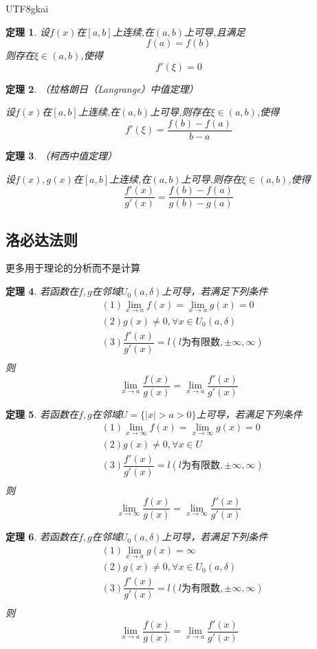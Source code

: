 \documentclass{article}
\newtheorem{theorem}{定理}[subsection]
\begin{document}
\begin{CJK}{UTF8}{gkai}
\begin{theorem}
  设$f(x)$在$[a,b]$上连续,在$(a,b)$上可导,且满足
  \[f(a) = f(b)\]
  则存在$\xi\in(a,b)$,使得
  \[f'(\xi) = 0\]
\end{theorem}

\begin{theorem}（拉格朗日（Langrange）中值定理）
    
  设$f(x)$在$[a,b]$上连续,在$(a,b)$上可导,则存在$\xi\in(a,b)$,使得
  \[f'(\xi) = \dfrac{f(b)-f(a)}{b-a}\]

\end{theorem}

\begin{theorem}（柯西中值定理）
        
  设$f(x),g(x)$在$[a,b]$上连续,在$(a,b)$上可导,则存在$\xi\in(a,b)$,使得
  \[\dfrac{f'(x)}{g'(x)} = \dfrac{f(b)-f(a)}{g(b)-g(a)}\]

\end{theorem}

\subsection{洛必达法则}
更多用于理论的分析而不是计算\\
\begin{theorem}
若函数在$f,g$在邻域$U_0(a,\delta)$上可导，若满足下列条件
\[
\begin{aligned}
&(1)\lim_{x\to a}f(x) =\lim_{x\to a } g(x) = 0\\
&(2)g(x) \neq 0 ,\forall x\in U_0(a,\delta)\\
&(3)\dfrac{f'(x)}{g'(x)} = l(l\text{为有限数},\pm\infty,\infty)\\
\end{aligned}
\]
则
\[\lim_{x\to a}\dfrac{f(x)}{g(x)}=\lim_{x\to a}\dfrac{f'(x)}{g'(x)}\]
\end{theorem}

\begin{theorem}
若函数在$f,g$在邻域$U = \{|x| > a > 0\}$上可导，若满足下列条件
\[
\begin{aligned}
&(1)\lim_{x\to \infty}f(x) =\lim_{x\to \infty } g(x) = 0\\
&(2)g(x) \neq 0 ,\forall x\in U\\
&(3)\dfrac{f'(x)}{g'(x)} = l(l\text{为有限数},\pm\infty,\infty)\\
\end{aligned}
\]
则
\[\lim_{x\to \infty}\dfrac{f(x)}{g(x)}=\lim_{x\to \infty}\dfrac{f'(x)}{g'(x)}\]
\end{theorem}

\begin{theorem}\label{lh3}
若函数在$f,g$在邻域$U_0(a,\delta)$上可导，若满足下列条件
\[
\begin{aligned}
&(1)\lim_{x\to a } g(x) = \infty\\
&(2)g(x) \neq 0 ,\forall x\in U_0(a,\delta)\\
&(3)\dfrac{f'(x)}{g'(x)} = l(l\text{为有限数},\pm\infty,\infty)\\
\end{aligned}
\]
则
\[\lim_{x\to a}\dfrac{f(x)}{g(x)}=\lim_{x\to a}\dfrac{f'(x)}{g'(x)}\]
\end{theorem}


\end{CJK}
\end{document}
